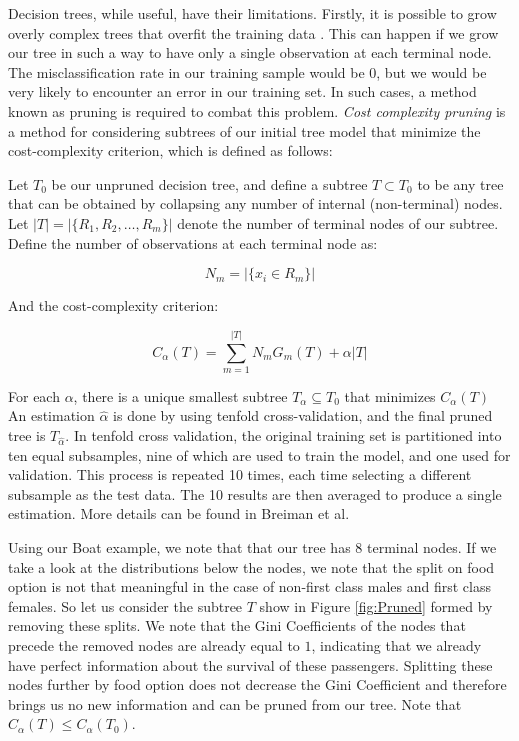 \documentclass[preprint,12pt]{elsarticle}
\begin{document}
Decision trees, while useful, have their limitations. Firstly, it is possible to grow overly complex trees that overfit the training data \cite{ISLR}. This can happen if we grow our tree in such a way to have only a single observation at each terminal node. The misclassification rate in our training sample would be $0$, but we would be very likely to encounter an error in our training set. In such cases, a method known as pruning is required to combat this problem. \textit{Cost complexity pruning} is a method for considering subtrees of our initial tree model that minimize the cost-complexity criterion, which is defined as follows\cite{ESL}:


Let $T_{0}$ be our unpruned decision tree, and define a subtree $T \subset T_{0}$ to be any tree that can be obtained by collapsing any number of internal (non-terminal) nodes. Let $|T| = |\{R_{1}, R_{2}, \ldots, R_{m}\}|$ denote the number of terminal nodes of our subtree. Define the number of observations at each terminal node as:

$$N_{m} = |\{x_{i} \in R_{m}\}| $$

\noindent And the cost-complexity criterion:

$$C_{\alpha}(T) = \sum\limits_{m=1}^{|T|} N_{m}G_{m}(T) + \alpha|T|$$

For each $\alpha$, there is a unique smallest subtree $T_{\alpha} \subseteq T_{0}$ that minimizes $C_{\alpha}(T)$ An estimation  $\hat{\alpha}$ is done by using tenfold cross-validation, and the final pruned tree is $T_{\hat{\alpha}}$. In tenfold cross validation, the original training set is partitioned into ten equal subsamples, nine of which are used to train the model, and one used for validation. This process is repeated 10 times, each time selecting a different subsample as the test data. The 10 results are then averaged to produce a single estimation. More details can be found in Breiman et al.\cite{Breiman1984}

Using our Boat example, we note that that our tree has 8 terminal nodes. If we take a look at the distributions below the nodes, we note that the split on food option is not that meaningful in the case of non-first class males and first class females. So let us consider the subtree $T$ show in Figure \ref{fig:Pruned} formed by removing these splits. We note that the Gini Coefficients of the nodes that precede the removed nodes are already equal to $1$, indicating that we already have perfect information about the survival of these passengers. Splitting these nodes further by food option does not decrease the Gini Coefficient and therefore brings us no new information and can be pruned from our tree. Note that $C_{\alpha}(T) \leq C_{\alpha}(T_{0})$.
\end{document}
